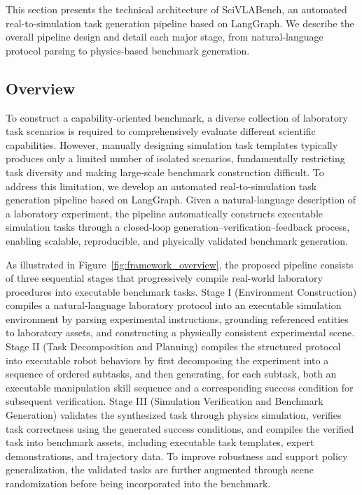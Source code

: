 \documentclass[sigconf]{acmart}
\begin{document}
This section presents the technical architecture of SciVLABench, an automated real-to-simulation task generation pipeline based on LangGraph. We describe the overall pipeline design and detail each major stage, from natural-language protocol parsing to physics-based benchmark generation.

\subsection{Overview}

To construct a capability-oriented benchmark, a diverse collection of laboratory task scenarios is required to comprehensively evaluate different scientific capabilities. However, manually designing simulation task templates typically produces only a limited number of isolated scenarios, fundamentally restricting task diversity and making large-scale benchmark construction difficult. To address this limitation, we develop an automated real-to-simulation task generation pipeline based on LangGraph. Given a natural-language description of a laboratory experiment, the pipeline automatically constructs executable simulation tasks through a closed-loop generation–verification–feedback process, enabling scalable, reproducible, and physically validated benchmark generation.

As illustrated in Figure~\ref{fig:framework_overview}, the proposed pipeline consists of three sequential stages that progressively compile real-world laboratory procedures into executable benchmark tasks. Stage I (Environment Construction) compiles a natural-language laboratory protocol into an executable simulation environment by parsing experimental instructions, grounding referenced entities to laboratory assets, and constructing a physically consistent experimental scene. Stage II (Task Decomposition and Planning) compiles the structured protocol into executable robot behaviors by first decomposing the experiment into a sequence of ordered subtasks, and then generating, for each subtask, both an executable manipulation skill sequence and a corresponding success condition for subsequent verification. Stage III (Simulation Verification and Benchmark Generation) validates the synthesized task through physics simulation, verifies task correctness using the generated success conditions, and compiles the verified task into benchmark assets, including executable task templates, expert demonstrations, and trajectory data. To improve robustness and support policy generalization, the validated tasks are further augmented through scene randomization before being incorporated into the benchmark.
\end{document}
